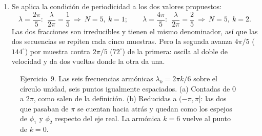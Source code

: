 \documentclass[10pt,a4paper]{article}
\begin{document}
\begin{enumerate}
		Escrita con frecuencia negativa, la armónica queda emparentada con otra del conjunto.
		Como $e^{-j\frac{2\pi}{3}n}$ es el conjugado de $e^{j\frac{2\pi}{3}n}$,
		\[
			\phi_4[n] = \overline{\phi_2[n]},
			\qquad\text{y del mismo modo}\qquad
			\phi_5[n] = \overline{\phi_1[n]} .
		\]
		Las seis armónicas son entonces la constante $\phi_0$, la que alterna $+1,-1$
		---$\phi_3$, con $\lambda = \pi$--- y dos pares conjugados, $(\phi_1,\phi_5)$ y
		$(\phi_2,\phi_4)$. Los dos paneles de la Figura~\ref{fig:sol_ej9} muestran el mismo
		conjunto con las dos escrituras: en el panel (a) los seis ángulos se cuentan siempre
		hacia el mismo lado, de $0$ a $2\pi$; en el (b), los dos que pasaban de $\pi$ se
		cuentan hacia atrás, y quedan como los espejos de $\phi_1$ y $\phi_2$ respecto del eje
		real.

		Ese cambio de escritura corrige una lectura equivocada de la velocidad. Reducidas a
		$(-\pi,\pi]$, las frecuencias del conjunto son $0$, $\pm\pi/3$, $\pm2\pi/3$ y $\pi$, y
		la velocidad de oscilación la fija el tamaño del paso angular. La más rápida es
		entonces $\phi_3$, la del medio de la lista. Aumentar $k$ de $3$ a $5$ no acelera nada:
		el vector empieza a girar en el otro sentido y cada vez más despacio, hasta que en
		$k=6$ vuelve a estar quieto.

		\item Se aplica la condición de
		periodicidad a los dos valores propuestos:
		\[
			\lambda = \frac{2\pi}{5}:\ \ \frac{\lambda}{2\pi}=\frac{1}{5}
			\ \Rightarrow\ N=5,\ k=1;
			\qquad
			\lambda = \frac{4\pi}{5}:\ \ \frac{\lambda}{2\pi}=\frac{2}{5}
			\ \Rightarrow\ N=5,\ k=2.
		\]
		Las dos fracciones son irreducibles y tienen el mismo denominador, así que las dos
		secuencias se repiten cada cinco muestras. Pero la segunda avanza $4\pi/5$
		($144^\circ$) por muestra contra $2\pi/5$ ($72^\circ$) de la primera: oscila al doble
		de velocidad y da dos vueltas donde la otra da una.
	\end{enumerate}

	\begin{figure}[H]
		\centering
		
		\caption{Ejercicio~9. Las seis frecuencias armónicas $\lambda_k = 2\pi k/6$
		sobre el círculo unidad, seis puntos igualmente espaciados. (a) Contadas de $0$
		a $2\pi$, como salen de la definición. (b) Reducidas a $(-\pi,\pi]$: las dos que
		pasaban de $\pi$ se cuentan hacia atrás y quedan como los espejos de $\phi_1$ y
		$\phi_2$ respecto del eje real. La armónica $k=6$ vuelve al punto de $k=0$.}
		\label{fig:sol_ej9}
	\end{figure}
\end{document}
